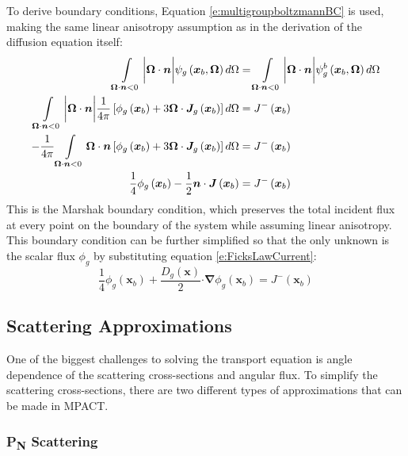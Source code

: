 To derive boundary conditions, Equation \ref{e:multigroupboltzmannBC} is used, making the same linear anisotropy assumption as in the derivation of the diffusion equation itself:
\begin{align}
\intop_{\bm \Omega \cdot \bm n < 0} \bigg|\bm \Omega \cdot \bm n\bigg|\psi_g\left(\bm x_b, \bm \Omega\right) d\Omega &= \intop_{\bm \Omega \cdot \bm n < 0} \bigg|\bm \Omega \cdot \bm n\bigg|\psi_g^b\left(\bm x_b, \bm \Omega\right) d\Omega \nonumber \\
\intop_{\bm \Omega \cdot \bm n < 0} \bigg|\bm \Omega \cdot \bm n\bigg| \frac{1}{4\pi} \left[\phi_g\left(\bm x_b\right) + 3\bm \Omega \cdot \bm J_g\left(\bm x_b\right)\right] d\Omega &= J^-\left(\bm x_b\right) \nonumber \\
-\frac{1}{4\pi}\intop_{\bm \Omega \cdot \bm n < 0} \bm \Omega \cdot \bm n \left[\phi_g\left(\bm x_b\right) + 3\bm \Omega \cdot \bm J_g\left(\bm x_b\right)\right] d\Omega &= J^-\left(\bm x_b\right) \nonumber \\
\frac{1}{4} \phi_g\left(\bm x_b\right) - \frac{1}{2} \bm n \cdot \bm J\left(\bm x_b\right) &= J^-\left(\bm x_b\right)
\end{align}
This is the Marshak boundary condition, which preserves the total incident flux at every point on the boundary of the system while assuming linear anisotropy.  This boundary condition can be further simplified so that the only unknown is the scalar flux $\phi_g$ by substituting equation \ref{e:FicksLawCurrent}:
\begin{equation}\label{e:DiffusionEquationBC}
\frac{1}{4} \phi_g\left(\bm x_b\right) + \frac{D_g\left(\bm x\right)}{2} \bm \cdot \bm \nabla \phi_g\left(\bm x_b\right) = J^-\left(\bm x_b\right)
\end{equation}

\subsection{Scattering Approximations}

One of the biggest challenges to solving the transport equation is angle dependence of the scattering cross-sections and angular flux.  To simplify the scattering cross-sections, there are two different types of approximations that can be made in MPACT.

\subsubsection{P\textsubscript{N} Scattering}

